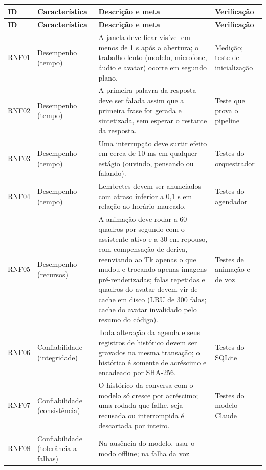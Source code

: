 \begin{singlespace}
\label{qua:rnf-1}
\small
\begin{tabularx}{\textwidth}{|C{1.4cm}|P{3.1cm}|L|P{2.8cm}|}
\hline
\textbf{ID} & \textbf{Característica} & \textbf{Descrição e meta} & \textbf{Verificação} \\ \hline
\endfirsthead
\hline
\textbf{ID} & \textbf{Característica} & \textbf{Descrição e meta} & \textbf{Verificação} \\ \hline
\endhead
RNF01 & Desempenho (tempo) & A janela deve ficar visível em menos de 1 s após a abertura; o trabalho lento
        (modelo, microfone, áudio e avatar) ocorre em segundo plano. & Medição; teste de inicialização \\ \hline
RNF02 & Desempenho (tempo) & A primeira palavra da resposta deve ser falada assim que a primeira frase
        for gerada e sintetizada, sem esperar o restante da resposta. & Teste que prova o pipeline \\ \hline
RNF03 & Desempenho (tempo) & Uma interrupção deve surtir efeito em cerca de 10 ms em qualquer estágio
        (ouvindo, pensando ou falando). & Testes do orquestrador \\ \hline
RNF04 & Desempenho (tempo) & Lembretes devem ser anunciados com atraso inferior a 0,1 s em relação ao
        horário marcado. & Testes do agendador \\ \hline
RNF05 & Desempenho (recursos) & A animação deve rodar a 60 quadros por segundo com o assistente ativo e a
        30 em repouso, com compensação de deriva, reenviando ao Tk apenas o que mudou e trocando apenas
        imagens pré-renderizadas; falas repetidas e quadros do avatar devem vir de
        cache em disco (LRU de 300 falas; cache do avatar invalidado pelo resumo do código). & Testes de animação e de voz \\ \hline
RNF06 & Confiabilidade (integridade) & Toda alteração da agenda e seus registros de histórico devem ser
        gravados na mesma transação; o histórico é somente de acréscimo e encadeado por SHA-256. & Testes do SQLite \\ \hline
RNF07 & Confiabilidade (consistência) & O histórico da conversa com o modelo só cresce por acréscimo;
        uma rodada que falhe, seja recusada ou interrompida é descartada por inteiro. & Testes do modelo Claude \\ \hline
RNF08 & Confiabilidade (tolerância a falhas) & Na ausência do modelo, usar o modo offline; na falha da voz

\end{tabularx}
\end{singlespace}
